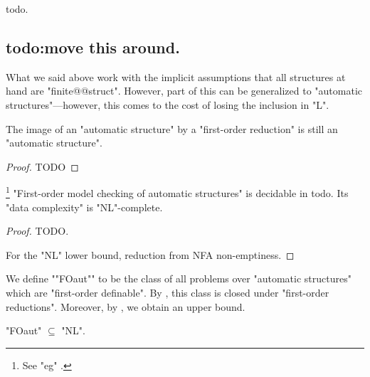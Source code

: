 todo.


\subsection{todo:move this around.}

What we said above work with the implicit assumptions that all structures at hand are 
"finite@@struct". However, part of this can be generalized to "automatic structures"---however, this comes to the cost of losing the inclusion in "L".

\begin{proposition}[Folklore]
	\AP\label{prop:first-order-reduction-preserve-automaticity}
	The image of an "automatic structure" by a "first-order reduction" is
	still an "automatic structure".
\end{proposition}
\begin{proof}
	TODO
\end{proof}


\begin{proposition}
	\!\footnote{See "eg" \cite[Theorem XII.1.7]{Blumensath2024MSOModelTheory}.}
	\label{prop:first-order-model-checking-automatic-structures}
	"First-order model checking of automatic structures" is decidable in todo.
	Its "data complexity" is "NL"-complete.
\end{proposition}

\begin{proof}
	TODO.

	For the "NL" lower bound, reduction from NFA non-emptiness.
\end{proof}

We define \AP""FOaut"" to be the class of all problems over "automatic structures"
which are "first-order definable". By ,
this class is closed under "first-order reductions". Moreover,
by , we obtain an upper bound.

\begin{proposition}
	"FOaut" $\subseteq$ "NL".
\end{proposition}


